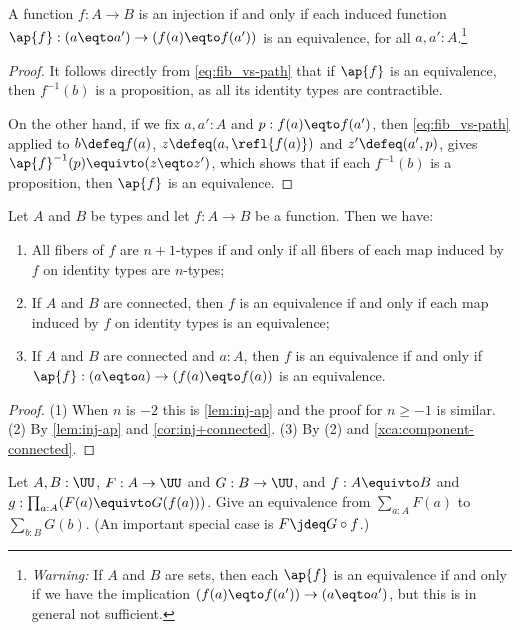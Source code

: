 \begin{lemma}\label{lem:inj-ap}
  A function $f:A\to B$ is an injection if and only if
  each induced function
  $\ap{f}: (a \eqto a') \to (f(a) \eqto f(a'))$ is an equivalence,
  for all $a,a':A$.\footnote{%
    \emph{Warning:}
    If $A$ and $B$ are sets, then each $\ap{f}$ is an equivalence
    if and only if we have the implication $(f(a) \eqto f(a')) \to (a \eqto a')$,
    but this is in general not sufficient.}
\end{lemma}

\begin{proof}
  It follows directly from \eqref{eq:fib_vs-path}
  that if $\ap{f}$ is an equivalence,
  then $f^{-1}(b)$ is a proposition,
  as all its identity types are contractible.

  On the other hand, if we fix $a,a':A$ and $p:f(a) \eqto f(a')$,
  then \eqref{eq:fib_vs-path} applied to $b \defeq f(a)$,
  $z \defeq (a,\refl{f(a)})$ and
  $z' \defeq (a',p)$,
  gives $\ap{f}^{-1}(p) \equivto (z \eqto z')$,
  which shows that if each $f^{-1}(b)$ is a proposition,
  then $\ap{f}$ is an equivalence.
\end{proof}


\begin{corollary}\label{cor:fib-vs-path}
Let $A$ and $B$ be types and let $f:A\to B$ be a function. Then we have:
\begin{enumerate}
\item\label{set-fib-vs-path}
All fibers of $f$ are $n+1$-types if and only if all fibers of
each map induced by $f$ on identity types are $n$-types;
\item\label{conn-fib-vs-path}
If $A$ and $B$ are connected, then $f$ is an equivalence
if and only if each map induced by $f$ on identity types is an equivalence;
\item\label{conn-fib-vs-path-point}
If $A$ and $B$ are connected and $a:A$, then $f$ is an equivalence
if and only if $\ap{f}: (a \eqto a) \to (f(a) \eqto f(a))$ is an equivalence.
\end{enumerate}
\end{corollary}
\begin{proof}
(1) When $n$ is $-2$ this is \cref{lem:inj-ap}
and the proof for $n\geq -1$ is similar.
(2) By \cref{lem:inj-ap} and \cref{cor:inj+connected}.
(3) By (2) and \cref{xca:component-connected}.
\end{proof}

\begin{xca}\label{xca:sum-equivalences}
Let $A,B:\UU$, $F:A\to\UU$ and $G:B\to\UU$,
and $f: A\equivto B$ and $g:\prod_{a:A}(F(a) \equivto G(f(a)))$.
Give an equivalence from $\sum_{a:A} F(a)$ to $\sum_{b:B} G(b)$.
(An important special case is $F\jdeq G\circ f$.)
\end{xca}


